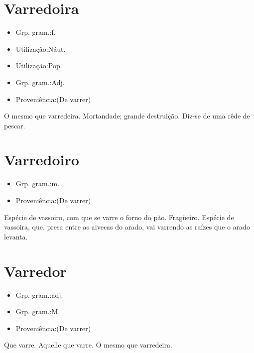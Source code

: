 \documentclass{article}
\begin{document}
\section{Varredoira}
\begin{itemize}
\item {Grp. gram.:f.}
\end{itemize}
\begin{itemize}
\item {Utilização:Náut.}
\end{itemize}
\begin{itemize}
\item {Utilização:Pop.}
\end{itemize}
\begin{itemize}
\item {Grp. gram.:Adj.}
\end{itemize}
\begin{itemize}
\item {Proveniência:(De \textunderscore varrer\textunderscore )}
\end{itemize}
O mesmo que \textunderscore varredeira\textunderscore .
Mortandade; grande destruição.
Diz-se de uma rêde de pescar.
\section{Varredoiro}
\begin{itemize}
\item {Grp. gram.:m.}
\end{itemize}
\begin{itemize}
\item {Proveniência:(De \textunderscore varrer\textunderscore )}
\end{itemize}
Espécie de vassoiro, com que se varre o forno do pão.
Fragüeiro.
Espécie de vassoira, que, presa entre as aivecas do arado, vai varrendo as raízes que o arado levanta.
\section{Varredor}
\begin{itemize}
\item {Grp. gram.:adj.}
\end{itemize}
\begin{itemize}
\item {Grp. gram.:M.}
\end{itemize}
\begin{itemize}
\item {Proveniência:(De \textunderscore varrer\textunderscore )}
\end{itemize}
Que varre.
Aquelle que varre.
O mesmo que \textunderscore varredeira\textunderscore .
\end{document}
